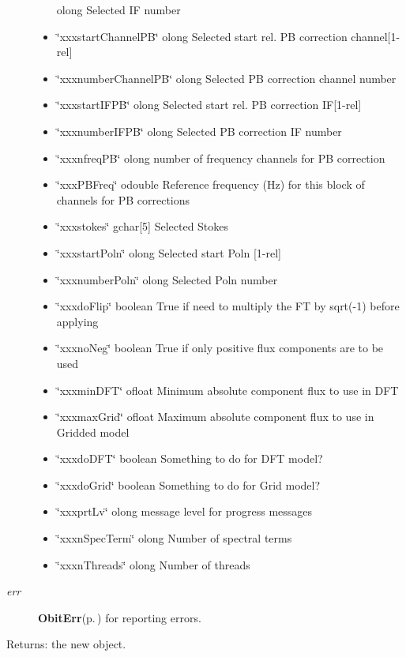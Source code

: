 \begin{Desc}
\begin{description}
\begin{itemize}
olong Selected IF number \item \char`\"{}xxxstart\-Channel\-PB\char`\"{} olong Selected start rel. PB correction channel[1-rel] \item \char`\"{}xxxnumber\-Channel\-PB\char`\"{} olong Selected PB correction channel number \item \char`\"{}xxxstart\-IFPB\char`\"{} olong Selected start rel. PB correction IF[1-rel] \item \char`\"{}xxxnumber\-IFPB\char`\"{} olong Selected PB correction IF number \item \char`\"{}xxxnfreq\-PB\char`\"{} olong number of frequency channels for PB correction \item \char`\"{}xxx\-PBFreq\char`\"{} odouble Reference frequency (Hz) for this block of channels for PB corrections \item \char`\"{}xxxstokes\char`\"{} gchar[5] Selected Stokes \item \char`\"{}xxxstart\-Poln\char`\"{} olong Selected start Poln [1-rel] \item \char`\"{}xxxnumber\-Poln\char`\"{} olong Selected Poln number \item \char`\"{}xxxdo\-Flip\char`\"{} boolean True if need to multiply the FT by sqrt(-1) before applying \item \char`\"{}xxxno\-Neg\char`\"{} boolean True if only positive flux components are to be used \item \char`\"{}xxxmin\-DFT\char`\"{} ofloat Minimum absolute component flux to use in DFT \item \char`\"{}xxxmax\-Grid\char`\"{} ofloat Maximum absolute component flux to use in Gridded model \item \char`\"{}xxxdo\-DFT\char`\"{} boolean Something to do for DFT model? \item \char`\"{}xxxdo\-Grid\char`\"{} boolean Something to do for Grid model? \item \char`\"{}xxxprt\-Lv\char`\"{} olong message level for progress messages \item \char`\"{}xxxn\-Spec\-Term\char`\"{} olong Number of spectral terms \item \char`\"{}xxxn\-Threads\char`\"{} olong Number of threads \end{itemize}
\item[{\em err}]{\bf Obit\-Err}{\rm (p.\,\pageref{structObitErr})} for reporting errors. \end{description}
\end{Desc}
\begin{Desc}
\item[Returns:]the new object. \end{Desc}
